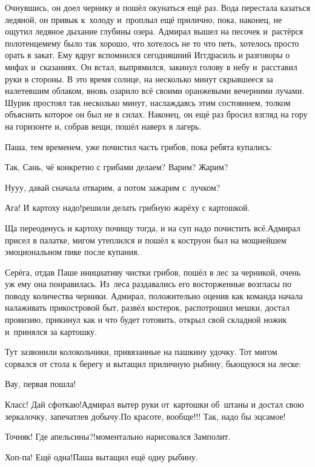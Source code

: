 Очнувшись, он доел чернику и пошёл окунаться ещё раз. Вода перестала казаться ледяной, он привык к~холоду и~проплыл ещё прилично, пока, наконец, не ощутил ледяное дыхание глубины озера. Адмирал вышел на песочек и~растёрся полотенцем\mdash ему было так хорошо, что хотелось не то что петь, хотелось просто орать в закат. Ему вдруг вспомнился сегодняшний Иггдрасиль и разговоры о мифах и~сказаниях. Он встал, выпрямился, закинул голову в небу и~расставил руки в стороны. В это время солнце, на несколько минут скрывшееся за налетевшим облаком, вновь озарило всё своими оранжевыми вечерними лучами. Шурик простоял так несколько минут, наслаждаясь этим состоянием, толком объяснить которое он был не в силах. Наконец, он ещё раз бросил взгляд на гору на горизонте и, собрав вещи, пошёл наверх в лагерь.

Паша, тем временем, уже почистил часть грибов, пока ребята купались:

\diagdash Так, Сань, чё конкретно с грибами делаем? Варим? Жарим?

\diagdash Ну\sdash у\sdash у, давай сначала отварим, а потом зажарим с~лучком?

\diagdash Ага! И картоху надо!\mdash решили делать грибную жарёху с картошкой.

\diagdash Ща переоденусь и картоху почищу тогда, и на суп надо почистить всё.\mdash Адмирал присел в палатке, мигом утеплился и пошёл к костру\mdash он был на мощнейшем эмоциональном пике после купания.

Серёга, отдав Паше инициативу чистки грибов, пошёл в лес за черникой, очень уж ему она понравилась. Из~леса раздавались его восторженные возгласы по поводу количества черники. Адмирал, положительно оценив как команда начала налаживать прикостровой быт, развёл костерок, распотрошил мешки, достал провизию, прикинул как и что будет готовить, открыл свой складной ножик и~принялся за картошку.

Тут зазвонили колокольчики, привязанные на пашкину удочку. Тот мигом сорвался от стола к берегу и вытащил приличную рыбину, бьющуюся на леске:

\diagdash Вау, первая пошла!

\diagdash Класс! Дай сфоткаю!\mdash Адмирал вытер руки от~картошки об~штаны и достал свою зеркалочку, запечатлев добычу.\mdash По красоте, вообще!!! Так, надо бы эц\sdash самое!

\diagdash Точняк! Где апельсины?!\mdash моментально нарисовался Замполит.

\diagdash Хоп-па! Ещё одна!\mdash Паша вытащил ещё одну рыбину.

